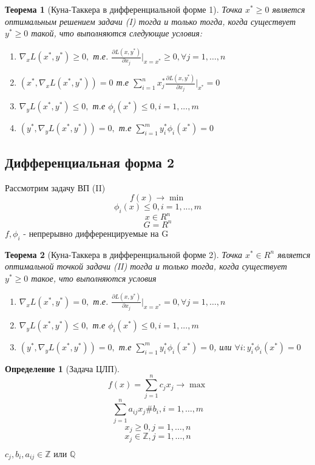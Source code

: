 \documentclass[a4paper]{article}
\newtheorem{theorem}{Теорема}[section]
\theoremstyle{definition}
\newtheorem*{definition}{Определение}
\theoremstyle{remark}
\begin{document}
\begin{theorem}[Куна-Таккера в дифференциальной форме 1]
	Точка $x^* \ge 0$ является оптимальным решением задачи (I) тогда  и только тогда, когда существует $y^*\ge 0$ такой, что выполняются следующие условия:
	\begin{enumerate}
		\item $\nabla_x L(x^*, y^*) \ge 0,$ т.е. $\frac{\partial L(x, y^*)}{\partial x_j} |_{x = x^*} \ge 0, \forall j = 1, \dots, n$
		\item $(x^*, \nabla_x L(x^*, y^*)) = 0$ т.е $\sum_{i = 1}^n x^*_j\frac{\partial L(x, y^*)}{\partial x_j}|_{x^*} = 0$
		\item $\nabla_y L(x^*, y^*) \le 0,$ т.е $\phi_i(x^*)\le 0, i = 1, ..., m$
		\item $(y^*, \nabla_y L(x^*, y^*)) = 0, $ т.е $\sum_{i = 1}^{m}y^*_i \phi_i(x^*) = 0$
	\end{enumerate}
\end{theorem}
\subsection*{Дифференциальная форма 2}
Рассмотрим задачу ВП (II)
\[f(x)\to \min\]
\[\phi_i(x)\le 0, i = 1, ..., m\]
\[x\in R^n\]
\[G = R^n\]
$f, \phi_i$ - непрерывно дифференцируемые на G
\begin{theorem}[Куна-Таккера в дифференциальной форме 2]
	Точка $x^*\in R^n$ является оптимальной точкой задачи (II)
	тогда и только тогда, когда существует $y^*\ge 0$ такое, что выполняются условия
	\begin{enumerate}
		\item $\nabla_x L(x^*, y^*) = 0,$ т.е.
		      $\frac{\partial L(x, y^*)}{\partial x_j} |_{x = x^*} = 0, \forall j = 1, \dots, n$
		\item $\nabla_y L(x^*, y^*) \le 0,$ т.е $\phi_i(x^*)\le 0, i = 1, ..., m$
		\item $(y^*, \nabla_y L(x^*, y^*)) = 0, $ т.е $\sum_{i = 1}^{m}y^*_i \phi_i(x^*) = 0$, или $\forall i: y^*_i \phi_i(x^*) = 0$
	\end{enumerate}
\end{theorem}
\begin{definition}[Задача ЦЛП]
	\begin{equation}
		f(x) = \sum_{j=1}^n c_j x_j \to \max
	\end{equation}
	\begin{equation}
		\sum_{j = 1}^n a_{ij}x_j \# b_i, i = 1, \dots, m
	\end{equation}
	\begin{equation}
		x_j \ge 0, j = 1, \dots, n
	\end{equation}
	\begin{equation}
		x_j \in \mathbb{Z}, j =1, \dots, n
	\end{equation}

	\(c_j, b_i, a_{ij} \in \mathbb{Z} \text{ или } \mathbb{Q}\)
\end{definition}
\end{document}
